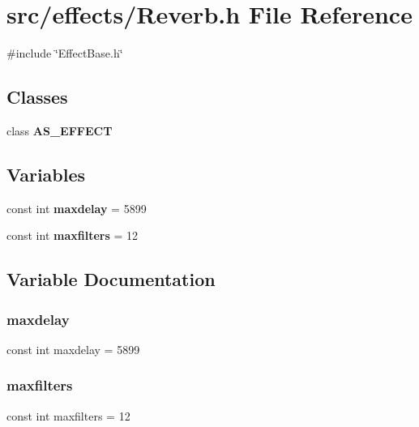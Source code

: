 \section{src/effects/\+Reverb.h File Reference}
\label{_reverb_8h}
{\ttfamily \#include \char`\"{}Effect\+Base.\+h\char`\"{}}\newline
\subsection*{Classes}
\begin{DoxyCompactItemize}
\item 
class \textbf{ A\+S\+\_\+\+E\+F\+F\+E\+CT}
\end{DoxyCompactItemize}
\subsection*{Variables}
\begin{DoxyCompactItemize}
\item 
const int \textbf{ maxdelay} = 5899
\item 
const int \textbf{ maxfilters} = 12
\end{DoxyCompactItemize}


\subsection{Variable Documentation}
\mbox{\label{_reverb_8h_a2c3e95b76c12e4693d8b63acaca69a23}} 
\subsubsection{maxdelay}
{\footnotesize\ttfamily const int maxdelay = 5899}

\mbox{\label{_reverb_8h_af899ad23e76d8483ee5ae05c5be43bc9}} 
\subsubsection{maxfilters}
{\footnotesize\ttfamily const int maxfilters = 12}

